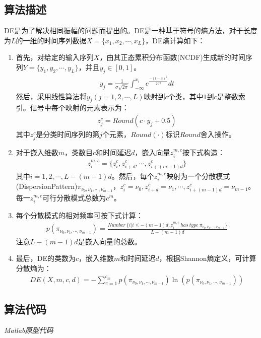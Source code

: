 \documentclass[cs4size,a4paper]{ctexart}
\begin{document}
\subsection{算法描述}
DE是为了解决相同振幅的问题而提出的。DE是一种基于符号的熵方法，对于长度为$L$的一维的时间序列数据$X=\{x_1,x_2,\cdots,x_L\}$，DE熵计算如下：
\begin{enumerate}
	\item 首先，对给定的输入序列$X$，由其正态累积分布函数(NCDF)生成新的时间序列$Y =\{y_1, y_2,\cdots,y_L\}$，并且$y_j\in[0, 1]$。
	      \begin{align}
		      y_j=\frac{1}{\sigma\sqrt{2\pi}}\int_{-\infty}^{x_i}e^{\frac{-(t-\mu)^2}{2\sigma^2}}dt
	      \end{align}
	      然后，采用线性算法将$y_j (j = 1, 2,\cdots , L)$映射到$c$个类，其中$1$到$c$是整数索引。信号中每个映射的元素表示为：
	      \begin{align}
		      z_j^c=Round(c\cdot y_j+0.5)
	      \end{align}
	      其中$z_j^c$是分类时间序列的第$j$个元素，$Round(\cdot)$标识$Round$舍入操作。
	\item 对于嵌入维数$m$，类数目$c$和时间延迟$d$，嵌入向量$z_i^{m,c}$按下式构造：
	      \begin{align}
		      z_i^{m,c}=\{z_i^c,z_{i+d}^c,\cdots,z_{i+(m-1)d}^c\}
	      \end{align}
	      其中$i=1,2,\cdots,L-(m-1)d$。然后，每个$z_i^{m,c}$映射为一个分散模式(DispersionPattern)$\pi_{\nu_0,\nu_1,\cdots,\nu_{m-1}}$，$z_i^c=\nu_0,z_{i+d}^c=\nu_1,\cdots,z_{i+(m-1)d}^c=\nu_{m-1}$。每一$z_i^{m,c}$可行分散模式总数为$c^m$。
	\item 每个分散模式的相对频率可按下式计算：
	      \begin{align}
		      p(\pi_{\nu_0,\nu_1,\cdots,\nu_{m-1}})=\frac{Number \ \{i|i\leq-(m-1)d,z_i^{m,c} \ has \ type \ \pi_{\nu_0,\nu_1,\cdots,\nu_{m-1}}\}}{L-(m-1)d}
	      \end{align}
	      注意$L-(m-1)d$是嵌入向量的总数。
	\item 最后，DE的类数为$c$，嵌入维数$m$和时间延迟$d$，根据Shannon熵定义，可计算分散熵为：
	      \begin{align}
		      DE(X,m,c,d)=-\sum_{\pi=1}^{c_m}p(\pi_{\nu_0,\nu_1,\cdots,\nu_{m-1}})\ln (p(\pi_{\nu_0,\nu_1,\cdots,\nu_{m-1}}))
	      \end{align}
\end{enumerate}

\subsection{算法代码}
\emph{Matlab原型代码}
\end{document}

